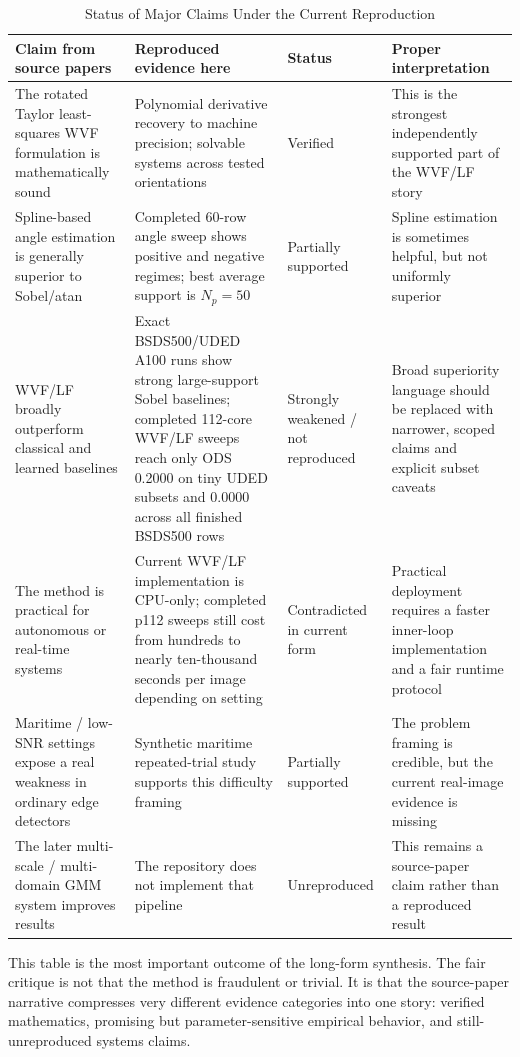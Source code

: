 \documentclass[conference]{IEEEtran}
\begin{document}
\begin{table}[t]
\centering
\caption{Status of Major Claims Under the Current Reproduction}
\label{tab:claims}
\scriptsize
\begin{tabular}{P{4.3cm}P{4.5cm}P{1.9cm}P{4.0cm}}
\toprule
Claim from source papers & Reproduced evidence here & Status & Proper interpretation \\
\midrule
The rotated Taylor least-squares WVF formulation is mathematically sound & Polynomial derivative recovery to machine precision; solvable systems across tested orientations & Verified & This is the strongest independently supported part of the WVF/LF story \\
Spline-based angle estimation is generally superior to Sobel/atan & Completed 60-row angle sweep shows positive and negative regimes; best average support is $N_p=50$ & Partially supported & Spline estimation is sometimes helpful, but not uniformly superior \\
WVF/LF broadly outperform classical and learned baselines & Exact BSDS500/UDED A100 runs show strong large-support Sobel baselines; completed 112-core WVF/LF sweeps reach only ODS 0.2000 on tiny UDED subsets and 0.0000 across all finished BSDS500 rows & Strongly weakened / not reproduced & Broad superiority language should be replaced with narrower, scoped claims and explicit subset caveats \\
The method is practical for autonomous or real-time systems & Current WVF/LF implementation is CPU-only; completed p112 sweeps still cost from hundreds to nearly ten-thousand seconds per image depending on setting & Contradicted in current form & Practical deployment requires a faster inner-loop implementation and a fair runtime protocol \\
Maritime / low-SNR settings expose a real weakness in ordinary edge detectors & Synthetic maritime repeated-trial study supports this difficulty framing & Partially supported & The problem framing is credible, but the current real-image evidence is missing \\
The later multi-scale / multi-domain GMM system improves results & The repository does not implement that pipeline & Unreproduced & This remains a source-paper claim rather than a reproduced result \\
\bottomrule
\end{tabular}
\end{table}

This table is the most important outcome of the long-form synthesis. The fair critique is not that the method is fraudulent or trivial. It is that the source-paper narrative compresses very different evidence categories into one story: verified mathematics, promising but parameter-sensitive empirical behavior, and still-unreproduced systems claims.
\end{document}

